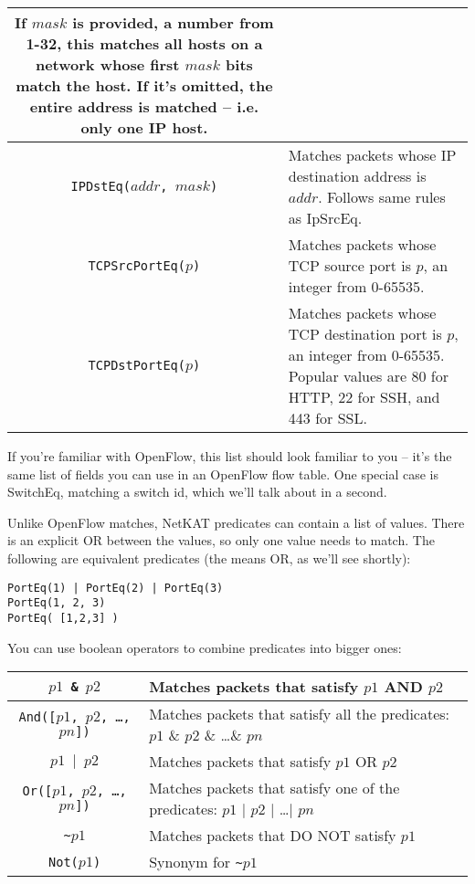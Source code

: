 \begin{tabularx}{\linewidth}{|c|X|}
If $mask$ is provided, a number from 1-32, this matches all hosts on a network whose first $mask$ bits match the host.
If it's omitted, the entire address is matched -- i.e. only one IP host.  
\\ \hline
\texttt{IPDstEq($addr$, $mask$)} & Matches packets whose IP destination address is $addr$.  
Follows same rules as IpSrcEq.
\\ \hline
\texttt{TCPSrcPortEq($p$)} & Matches packets whose TCP source port is $p$, an integer from 0-65535.
\\ \hline
\texttt{TCPDstPortEq($p$)} & Matches packets whose TCP destination port is $p$, an integer from 0-65535.
Popular values are 80 for HTTP, 22 for SSH, and 443 for SSL.  
\\ \hline\hline
\end{tabularx}

\bigskip
If you're familiar with OpenFlow, this list should look familiar to you -- it's the same list of fields you can 
use in an OpenFlow flow table.
One special case is SwitchEq, matching a switch id, which we'll talk about in a second.  

Unlike OpenFlow matches, NetKAT predicates can contain a list of values.  There is an explicit OR between 
the values, so only one value needs to match.  The following are equivalent predicates (the \netkat{|} means
OR, as we'll see shortly):

\begin{verbatim}
PortEq(1) | PortEq(2) | PortEq(3)
PortEq(1, 2, 3)
PortEq( [1,2,3] )
\end{verbatim}

You can use boolean operators to combine predicates into bigger ones:

\bigskip
\begin{tabularx}{\linewidth}{|c|X|}
\hline\hline
\texttt{$p1$ \& $p2$} & Matches packets that satisfy $p1$ AND $p2$
\\ \hline  
\texttt{And([$p1$, $p2$, \ldots, $pn$])} & 
Matches packets that satisfy all the predicates: $p1$ \& $p2$ \& \ldots \& $pn$
\\ \hline  
\texttt{$p1$ $\vert$ $p2$} & Matches packets that satisfy $p1$ OR $p2$
\\ \hline  
\texttt{Or([$p1$, $p2$, \ldots, $pn$])} & 
Matches packets that satisfy one of the predicates: $p1$ $\vert$ $p2$ $\vert$ \ldots $\vert$ $pn$
\\ \hline  
\texttt{\textasciitilde $p1$} & Matches packets that DO NOT satisfy $p1$
\\ \hline  
\texttt{Not($p1$)} & Synonym for \texttt{\textasciitilde $p1$}
\\ \hline\hline
\end{tabularx}

